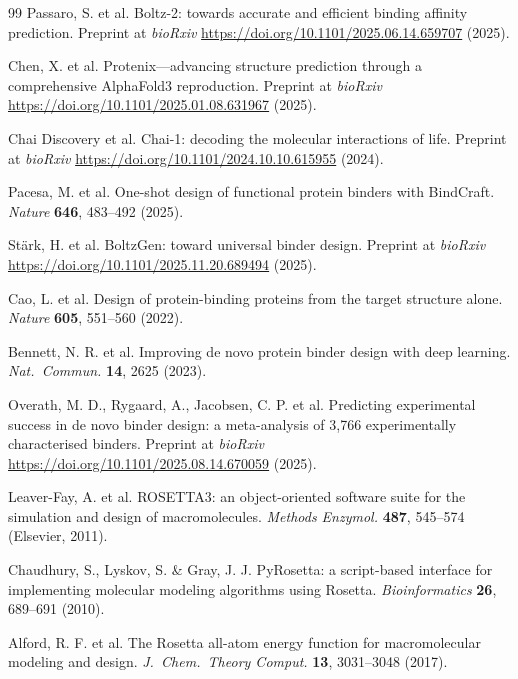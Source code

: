 \documentclass[10pt,twocolumn]{article}
\begin{document}
\begin{thebibliography}{99}
Passaro, S. et al. Boltz-2: towards accurate and efficient binding affinity prediction. Preprint at \textit{bioRxiv} \url{https://doi.org/10.1101/2025.06.14.659707} (2025).

Chen, X. et al. Protenix---advancing structure prediction through a comprehensive AlphaFold3 reproduction. Preprint at \textit{bioRxiv} \url{https://doi.org/10.1101/2025.01.08.631967} (2025).

Chai Discovery et al. Chai-1: decoding the molecular interactions of life. Preprint at \textit{bioRxiv} \url{https://doi.org/10.1101/2024.10.10.615955} (2024).

Pacesa, M. et al. One-shot design of functional protein binders with BindCraft. \textit{Nature} \textbf{646}, 483--492 (2025).

St{\"a}rk, H. et al. BoltzGen: toward universal binder design. Preprint at \textit{bioRxiv} \url{https://doi.org/10.1101/2025.11.20.689494} (2025).

Cao, L. et al. Design of protein-binding proteins from the target structure alone. \textit{Nature} \textbf{605}, 551--560 (2022).

Bennett, N. R. et al. Improving de novo protein binder design with deep learning. \textit{Nat.\ Commun.} \textbf{14}, 2625 (2023).

Overath, M. D., Rygaard, A., Jacobsen, C. P. et al. Predicting experimental success in de novo binder design: a meta-analysis of 3,766 experimentally characterised binders. Preprint at \textit{bioRxiv} \url{https://doi.org/10.1101/2025.08.14.670059} (2025).

Leaver-Fay, A. et al. ROSETTA3: an object-oriented software suite for the simulation and design of macromolecules. \textit{Methods Enzymol.} \textbf{487}, 545--574 (Elsevier, 2011).

Chaudhury, S., Lyskov, S. \& Gray, J. J. PyRosetta: a script-based interface for implementing molecular modeling algorithms using Rosetta. \textit{Bioinformatics} \textbf{26}, 689--691 (2010).

Alford, R. F. et al. The Rosetta all-atom energy function for macromolecular modeling and design. \textit{J.\ Chem.\ Theory Comput.} \textbf{13}, 3031--3048 (2017).


\end{thebibliography}
\end{document}
